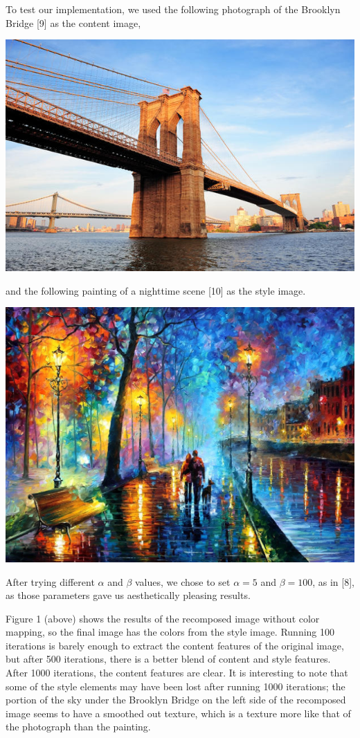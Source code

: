 \documentclass[10pt,twocolumn,letterpaper]{article}
\begin{document}
To test our implementation, we used the following photograph of the Brooklyn Bridge [9] as the content image,\begin{center}
\includegraphics[width=0.8\linewidth]{content1.jpg}
\end{center}
and the following painting of a nighttime scene [10] as the style image.
\begin{center}
\includegraphics[width=0.8\linewidth]{style1.jpeg}
\end{center}

After trying different $\alpha$ and $\beta$ values, we chose to set $\alpha = 5$ and $\beta = 100$, as in [8], as those parameters gave us aesthetically pleasing results. 

Figure 1 (above) shows the results of the recomposed image without color mapping, so the final image has the colors from the style image. Running 100 iterations is barely enough to extract the content features of the original image, but after 500 iterations, there is a better blend of content and style features. After 1000 iterations, the content features are clear. It is interesting to note that some of the style elements may have been lost after running 1000 iterations; the portion of the sky under the Brooklyn Bridge on the left side of the recomposed image seems to have a smoothed out texture, which is a texture more like that of the photograph than the painting.
\end{document}
